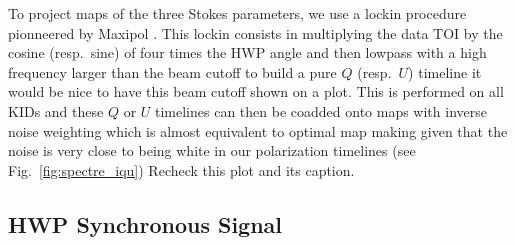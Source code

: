 \documentclass[twocolumn,traditabstract]{aa}
\begin{document}
{To project maps of the three Stokes parameters, we use a lockin procedure
pionneered by Maxipol \citep{johnson2007}. This lockin consists in multiplying
the data TOI by the cosine (resp.~sine) of four times the HWP angle and then
lowpass with a high frequency larger than the beam cutoff to build a pure $Q$
(resp.~$U$) timeline {\color{red} it would be nice to have this beam cutoff shown
  on a plot}. This is performed on all KIDs and these $Q$ or $U$
timelines can then be coadded onto maps with inverse noise weighting which is
almost equivalent to optimal map making given that the noise is very close to
being white in our polarization timelines (see Fig.~\ref{fig:spectre_iqu})
{\color{red} Recheck this plot and its caption}.
	


\subsection{HWP Synchronous Signal}
\label{se:hwpss}

}
\end{document}

